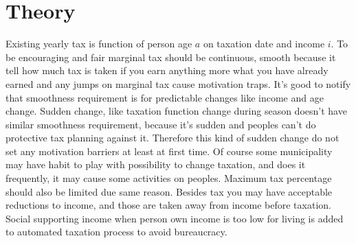 %
%
%
\chapter{Theory}
\label{theory}
Existing yearly tax is function of person age $a$ on taxation date and income
$i$. To be encouraging and fair marginal tax should be continuous, smooth
because it tell how much tax is taken if you earn anything more what you have
already earned and any jumps on marginal tax cause motivation traps. It's good
to notify that smoothness requirement is for predictable changes like income
and age chan\-ge. Sudden change, like taxation function change during season
doesn't have similar smoothness requirement, because it's sudden and peoples
can't do protective tax planning against it. Therefore this kind of sudden
change do not set any motivation barriers at least at first time. Of course
some municipality may have habit to play with possibility to change taxation,
and does it frequently, it may cause some activities on peoples. Maximum tax
percentage should also be limited due same reason. Besides tax you may have
acceptable reductions to income, and those are taken away from income before
taxation. Social supporting income when person own income is too low for
living is added to automated taxation process to avoid bureaucracy.
